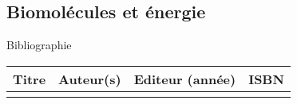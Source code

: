 \begin{headerBlock}
\chapter{Biomolécules et énergie}
\label{LC_BiomoleculesEnergie}
 \end{headerBlock}



\begin{reportBlock}{Bibliographie}

\begin{center}
\begin{tabularx}{\textwidth}{| X | X | c | c |}\hline
Titre & Auteur(s) & Editeur (année) & ISBN \\ \hline
 &  &  &  \\ 
 \hline
\end{tabularx}
\end{center}

\end{reportBlock}

